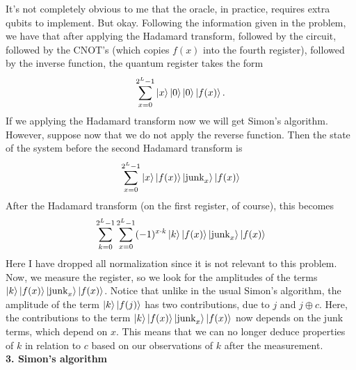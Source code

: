 \documentclass{article}
\theoremstyle{definition}
\begin{document}
\noindent It's not completely obvious to me that the oracle, in practice, requires extra qubits to implement. But okay. Following the information given in the problem, we have that after applying the Hadamard transform, followed by the circuit, followed by the CNOT's (which copies $f(x)$ into the fourth register), followed by the inverse function, the quantum register takes the form
\begin{align*}
	\sum_{x=0}^{2^L-1} \ket{x}\ket{0}\ket{0} \ket{f(x)}.
\end{align*}
If we applying the Hadamard transform now we will get Simon's algorithm. However, suppose now that we do not apply the reverse function. Then the state of the system before the second Hadamard transform is 
\begin{align*}
	\sum_{x=0}^{2^L-1} \ket{x}\ket{f(x)}\ket{\text{junk}_x} \ket{f(x)}
\end{align*}
After the Hadamard transform (on the first register, of course), this becomes
\begin{align*}
	\sum_{k=0}^{2^L-1}\sum_{x=0}^{2^L-1}  (-1)^{x\cdot k}\ket{k}\ket{f(x)}\ket{\text{junk}_x} \ket{f(x)}
\end{align*}
Here I have dropped all normalization since it is not relevant to this problem. Now, we measure the register, so we look for the amplitudes of the terms $\ket{k}\ket{f(x)}\ket{\text{junk}_x} \ket{f(x)}$. Notice that unlike in the usual Simon's algorithm, the amplitude of the term $\ket{k}\ket{f(j)}$ has two contributions, due to $j$ and $j\oplus c$. Here, the contributions to the term $\ket{k}\ket{f(x)}\ket{\text{junk}_x} \ket{f(x)}$ now depends on the junk terms, which depend on $x$. This means that we can no longer deduce properties of $k$ in relation to $c$ based on our observations of $k$ after the measurement.\\



\noindent \textbf{3. Simon's algorithm}
\end{document}
